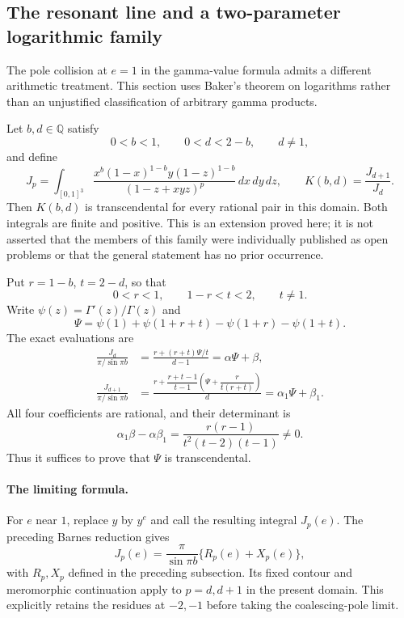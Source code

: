\documentclass[11pt,a4paper]{article}
\theoremstyle{definition}
\theoremstyle{remark}
\numberwithin{equation}{section}
\begin{document}
\subsection{The resonant line and a two-parameter logarithmic family}
\label{fields-sec:barnes-logarithmic-family}

The pole collision at $e=1$ in the gamma-value formula admits a
different arithmetic treatment.  This section uses Baker's theorem
on logarithms \cite{fields-Baker} rather than an unjustified classification of arbitrary
gamma products.

Let $b,d\in\mathbb Q$ satisfy
\[
 0<b<1,\qquad 0<d<2-b,\qquad d\ne1,
\]
and define
\[
 J_p=\int_{[0,1]^3}
 \frac{x^b(1-x)^{1-b}y(1-z)^{1-b}}
      {(1-z+xyz)^p}\,dx\,dy\,dz,
 \qquad K(b,d)=\frac{J_{d+1}}{J_d}.
\]
Then $K(b,d)$ is transcendental for every rational pair in this
domain.  Both integrals are finite and positive.  This is an
extension proved here; it is not asserted that the members of this
family were individually published as open problems or that the
general statement has no prior occurrence.

Put $r=1-b$, $t=2-d$, so that
\[
 0<r<1,\qquad 1-r<t<2,\qquad t\ne1.
\]
Write $\psi(z)=\Gamma'(z)/\Gamma(z)$ and
\[
 \Psi=\psi(1)+\psi(1+r+t)-\psi(1+r)-\psi(1+t).
\]
The exact evaluations are
\begin{align}
 \frac{J_d}{\pi/\sin\pi b}
 &=\frac{r+(r+t)\Psi/t}{d-1}=\alpha\Psi+\beta,
 \label{fields-eq:resonant-J0}\\
 \frac{J_{d+1}}{\pi/\sin\pi b}
 &=\frac{r+\dfrac{r+t-1}{t-1}
           \left(\Psi+\dfrac{r}{t(r+t)}\right)}{d}
   =\alpha_1\Psi+\beta_1.
 \label{fields-eq:resonant-J1}
\end{align}
All four coefficients are rational, and their determinant is
\begin{equation}
 \alpha_1\beta-\alpha\beta_1
 =\frac{r(r-1)}{t^2(t-2)(t-1)}\ne0.
 \label{fields-eq:resonant-determinant}
\end{equation}
Thus it suffices to prove that $\Psi$ is transcendental.

\paragraph{The limiting formula.}
For $e$ near $1$, replace $y$ by $y^e$ and call the resulting integral
$J_p(e)$. The preceding Barnes reduction gives
\[
 J_p(e)=\frac{\pi}{\sin\pi b}\{R_p(e)+X_p(e)\},
\]
with $R_p,X_p$ defined in the preceding subsection. Its fixed contour and
meromorphic continuation apply to $p=d,d+1$ in the present domain.
This explicitly retains the residues at $-2,-1$ before taking the
coalescing-pole limit.
\end{document}
